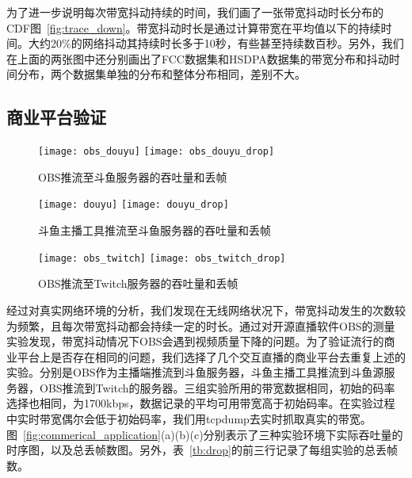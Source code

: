 为了进一步说明每次带宽抖动持续的时间，我们画了一张带宽抖动时长分布的CDF图~\ref{fig:trace_down}。带宽抖动时长是通过计算带宽在平均值以下的持续时间。大约20\%的网络抖动其持续时长多于10秒，有些甚至持续数百秒。另外，我们在上面的两张图中还分别画出了FCC数据集和HSDPA数据集的带宽分布和抖动时间分布，两个数据集单独的分布和整体分布相同，差别不大。

\subsection{商业平台验证}

\begin{figure*}[htb]
  \centering%
  \begin{subfigure}[b]{\textwidth}
    \texttt{[image: obs\_douyu]}
    \hfill
    \texttt{[image: obs\_douyu\_drop]}
    \caption{OBS推流至斗鱼服务器的吞吐量和丢帧}
    \label{fig:obs_douyu}
  \end{subfigure}
  \vfill
  \vspace{0.2in}
  \begin{subfigure}[b]{\textwidth}
    \texttt{[image: douyu]}
    \hfill
    \texttt{[image: douyu\_drop]}
    \caption{斗鱼主播工具推流至斗鱼服务器的吞吐量和丢帧}
    \label{fig:douyu}
  \end{subfigure}
  \vfill
  \vspace{0.2in}
  \begin{subfigure}[b]{\textwidth}
    \texttt{[image: obs\_twitch]}
    \hfill
    \texttt{[image: obs\_twitch\_drop]}
    \caption{OBS推流至Twitch服务器的吞吐量和丢帧}
    \label{fig:twitch}
  \end{subfigure}
  \caption{商业平台验证实验}
  \label{fig:commerical_application}
\end{figure*}


经过对真实网络环境的分析，我们发现在无线网络状况下，带宽抖动发生的次数较为频繁，且每次带宽抖动都会持续一定的时长。通过对开源直播软件OBS的测量实验发现，带宽抖动情况下OBS会遇到视频质量下降的问题。为了验证流行的商业平台上是否存在相同的问题，我们选择了几个交互直播的商业平台去重复上述的实验。分别是OBS作为主播端推流到斗鱼服务器，斗鱼主播工具推流到斗鱼源服务器，OBS推流到Twitch的服务器。三组实验所用的带宽数据相同，初始的码率选择也相同，为1700kbps，数据记录的平均可用带宽高于初始码率。在实验过程中实时带宽偶尔会低于初始码率，我们用tcpdump去实时抓取真实的带宽。图~\ref{fig:commerical_application}(a)(b)(c)分别表示了三种实验环境下实际吞吐量的时序图，以及总丢帧数图。另外，表~\ref{tb:drop}的前三行记录了每组实验的总丢帧数。

